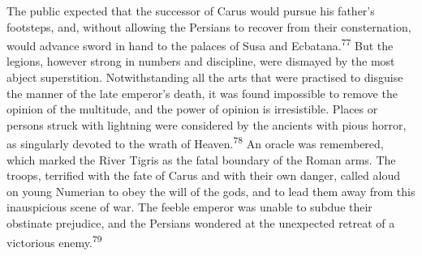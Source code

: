 The public expected that the successor of Carus would pursue his
father’s footsteps, and, without allowing the Persians to recover
from their consternation, would advance sword in hand to the
palaces of Susa and Ecbatana.\textsuperscript{77} But the legions, however strong
in numbers and discipline, were dismayed by the most abject
superstition. Notwithstanding all the arts that were practised to
disguise the manner of the late emperor’s death, it was found
impossible to remove the opinion of the multitude, and the power
of opinion is irresistible. Places or persons struck with
lightning were considered by the ancients with pious horror, as
singularly devoted to the wrath of Heaven.\textsuperscript{78} An oracle was
remembered, which marked the River Tigris as the fatal boundary
of the Roman arms. The troops, terrified with the fate of Carus
and with their own danger, called aloud on young Numerian to obey
the will of the gods, and to lead them away from this
inauspicious scene of war. The feeble emperor was unable to
subdue their obstinate prejudice, and the Persians wondered at
the unexpected retreat of a victorious enemy.\textsuperscript{79}




